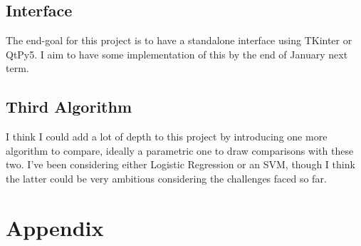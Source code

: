 \documentclass[letterpaper,10pt]{article}
\begin{document}
\subsection{Interface}
The end-goal for this project is to have a standalone interface using TKinter or QtPy5. I aim to have some implementation of this by the end of January next term. \par
\subsection{Third Algorithm}
I think I could add a lot of depth to this project by introducing one more algorithm to compare, ideally a parametric one to draw comparisons with these two. I've been considering either Logistic Regression or an SVM, though I think the latter could be very ambitious considering the challenges faced so far. \par
\newpage




\appendix
\newpage
\section{Appendix}
\end{document}
